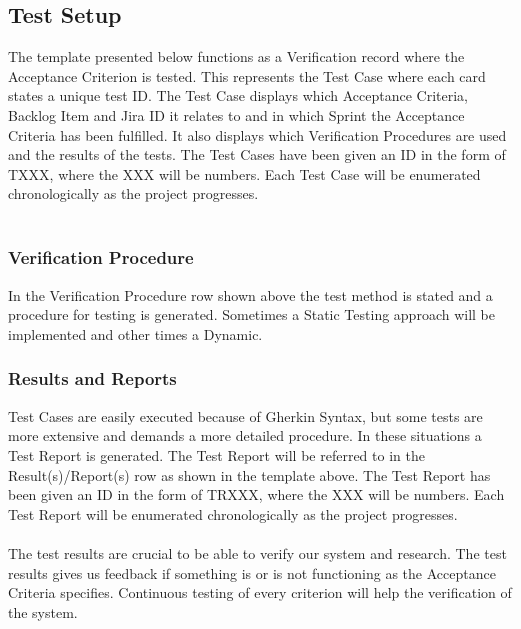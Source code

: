 \newpage

\subsection {Test Setup}
The template presented below functions as a Verification record where the Acceptance Criterion is tested. This represents the Test Case where each card states a unique test ID. The Test Case displays which Acceptance Criteria, Backlog Item and Jira ID it relates to and in which Sprint the Acceptance Criteria has been fulfilled. It also displays which Verification Procedures are used and the results of the tests. The Test Cases have been given an ID in the form of TXXX, where the XXX will be numbers. Each Test Case will be enumerated chronologically as the project progresses. \\
\\
         {}
         {\shortstack[l]{}}
         {}
         {\shortstack[l]{}}

\subsubsection{Verification Procedure}
In the Verification Procedure row shown above the test method is stated and a procedure for testing is generated. Sometimes a Static Testing approach will be implemented and other times a Dynamic. 
\\
\subsubsection{Results and Reports}
Test Cases are easily executed because of Gherkin Syntax, but some tests are more extensive and demands a more detailed procedure. In these situations a Test Report is generated. The Test Report will be referred to in the Result(s)/Report(s) row as shown in the template above. The Test Report has been given an ID in the form of TRXXX, where the XXX will be numbers. Each Test Report will be enumerated chronologically as the project progresses. \\ 
\\
The test results are crucial to be able to verify our system and research. The test results gives us feedback if something is or is not functioning as the Acceptance Criteria specifies. Continuous testing of every criterion will help the verification of the system. \\
\newpage

